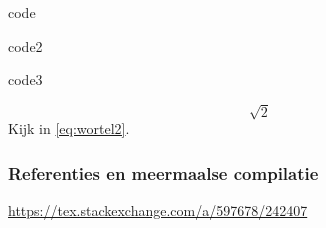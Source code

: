 \documentclass{cursuspresentatie}
\begin{document}
    \begin{saveblock}{code}
        \begin{hllblock}[linewidth=\textwidth,gobble=12]
        \end{hllblock}
    \end{saveblock}

    \begin{saveblock}{code2}
        \begin{hllblock}[linewidth=\textwidth,gobble=12]
        \end{hllblock}
    \end{saveblock}

    \begin{saveblock}{code3}
        \begin{hllblock}[linewidth=\textwidth,gobble=12]
            \begin{equation}\label{eq:wortel2}
                \sqrt{2}
            \end{equation}
            Kijk in \eqref{eq:wortel2}.
        \end{hllblock}
    \end{saveblock}

    \begin{frame}
        \frametitle{Referenties en meermaalse compilatie}




        \url{https://tex.stackexchange.com/a/597678/242407}
    \end{frame}



\end{document}
